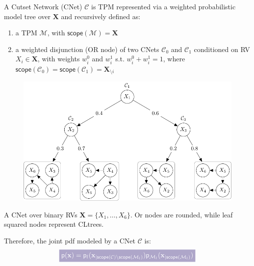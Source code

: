 \documentclass[final]{beamer}
\newcommand{\highlight}[2][yellow]{\mathchoice%
  {\colorbox{#1}{\strut\textcolor{white}{$\displaystyle{#2}$}}}%
  {\colorbox{#1}{\strut\textcolor{white}{$\textstyle{#2}$}}}%
  {\colorbox{#1}{\strut\textcolor{white}{$\scriptstyle{#2}$}}}%
  {\colorbox{#1}{\strut\textcolor{white}{$\scriptscriptstyle{#2}$}}}}%
\begin{document}
\begin{frame}{}
\begin{textblock}{17.5}
    A Cutset Network (CNet) $\mathcal{C}$ is TPM represented via a
    weighted probabilistic model tree over $\mathbf{X}$ and
    recursively defined as:
    \begin{enumerate}
    \item a TPM $\mathcal{M}$, with
      $\mathsf{scope}(\mathcal{M})=\mathbf X$
      \item a weighted  disjunction (OR node) of two CNets $\mathcal C_0$ and $\mathcal C_1$
     conditioned on RV $X_i \in \mathbf X$,  with
    weights $w_i^0$ and $w_i^1$ s.t. $w_i^0 + w_i^1 = 1$,
    where $\mathsf{scope}(\mathcal C_{0})=\mathsf{scope}(\mathcal C_{1})=\mathbf X_{\setminus i}$
    \end{enumerate}
    \begin{figure}
     \centering
     \includegraphics[width=15cm]{figures/csn}
  \label{fig:csn}
\end{figure}
\hspace{50pt}
\begin{minipage}{0.8\linewidth}
\scriptsize  A CNet over binary RVs
$\mathbf{X}=\{X_1,\dots,X_{6}\}$. Or nodes are rounded, while leaf squared nodes represent CLtrees.
\end{minipage}

\vspace{20pt}
Therefore, the joint pdf modeled by a CNet $\mathcal{C}$ is:
\begin{equation}
\highlight[lacamlightlilac]{\mathsf{p}(\mathbf{x}) = \mathsf{p}_l(\mathbf
x_{|\mathsf{scope}(\mathcal C)\setminus \mathsf{scope}(\mathcal
  M_l)})\mathsf{p}_{\mathcal M_l}(\mathbf x_{| \mathsf{scope}(\mathcal
  M_l)})}\label{eq:cnetdistr}
\end{equation}


  \end{textblock}


\end{frame}
\end{document}
